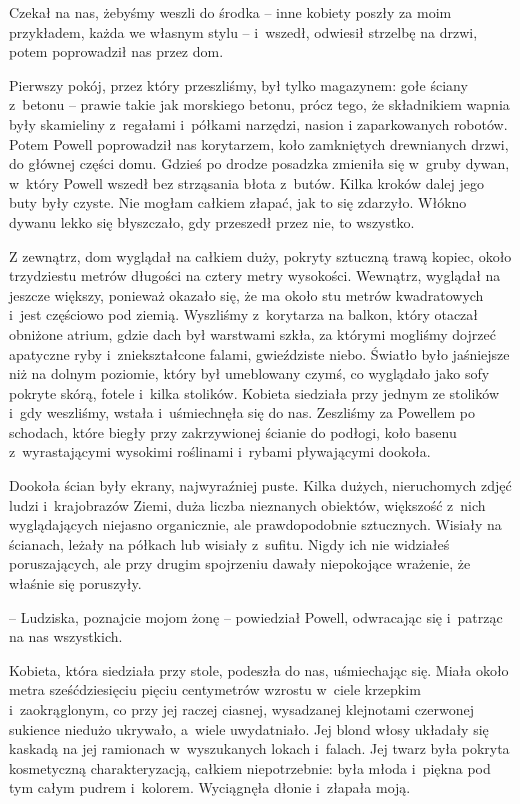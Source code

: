 \documentclass[oneside,polish,11pt,sfheadings]{mwbk}
\begin{document}
Czekał na nas, żebyśmy weszli do środka -- inne kobiety poszły za moim przykładem, każda we własnym stylu -- i~wszedł, odwiesił strzelbę na drzwi, potem poprowadził nas przez dom.

Pierwszy pokój, przez który przeszliśmy, był tylko magazynem: gołe
ściany z~betonu -- prawie takie jak morskiego betonu, prócz tego, że
składnikiem wapnia były skamieliny z~regałami i~półkami narzędzi, nasion
i zaparkowanych robotów. Potem Powell poprowadził nas korytarzem, koło
zamkniętych drewnianych drzwi, do głównej części domu. Gdzieś po drodze
posadzka zmieniła się w~gruby dywan, w~który Powell wszedł bez
strząsania błota z~butów. Kilka kroków dalej jego buty były czyste. Nie
mogłam całkiem złapać, jak to się zdarzyło. Włókno dywanu lekko się
błyszczało, gdy przeszedł przez nie, to wszystko.

Z zewnątrz, dom wyglądał na całkiem duży, pokryty sztuczną trawą kopiec,
około trzydziestu metrów długości na cztery metry wysokości. Wewnątrz,
wyglądał na jeszcze większy, ponieważ okazało się, że ma około stu
metrów kwadratowych i~jest częściowo pod ziemią. Wyszliśmy z~korytarza
na balkon, który otaczał obniżone atrium, gdzie dach był warstwami
szkła, za którymi mogliśmy dojrzeć apatyczne ryby i~zniekształcone
falami, gwieździste niebo. Światło było jaśniejsze niż na dolnym
poziomie, który był umeblowany czymś, co wyglądało jako sofy pokryte
skórą, fotele i~kilka stolików. Kobieta siedziała przy jednym ze
stolików i~gdy weszliśmy, wstała i~uśmiechnęła się do nas. Zeszliśmy za
Powellem po schodach, które biegły przy zakrzywionej ścianie do podłogi,
koło basenu z~wyrastającymi wysokimi roślinami i~rybami pływającymi
dookoła.

Dookoła ścian były ekrany, najwyraźniej puste. Kilka dużych,
nieruchomych zdjęć ludzi i~krajobrazów Ziemi, duża liczba nieznanych
obiektów, większość z~nich wyglądających niejasno organicznie, ale
prawdopodobnie sztucznych. Wisiały na ścianach, leżały na półkach lub
wisiały z~sufitu. Nigdy ich nie widziałeś poruszających, ale przy drugim
spojrzeniu dawały niepokojące wrażenie, że właśnie się poruszyły.

-- Ludziska, poznajcie mojom żonę -- powiedział Powell, odwracając się i~patrząc na nas wszystkich.

Kobieta, która siedziała przy stole, podeszła do nas, uśmiechając się.
Miała około metra sześćdziesięciu pięciu centymetrów wzrostu w~ciele
krzepkim i~zaokrąglonym, co przy jej raczej ciasnej, wysadzanej
klejnotami czerwonej sukience niedużo ukrywało, a~wiele uwydatniało. Jej
blond włosy układały się kaskadą na jej ramionach w~wyszukanych lokach i~falach. Jej twarz była pokryta kosmetyczną charakteryzacją, całkiem
niepotrzebnie: była młoda i~piękna pod tym całym pudrem i~kolorem.
Wyciągnęła dłonie i~złapała moją.
\end{document}
